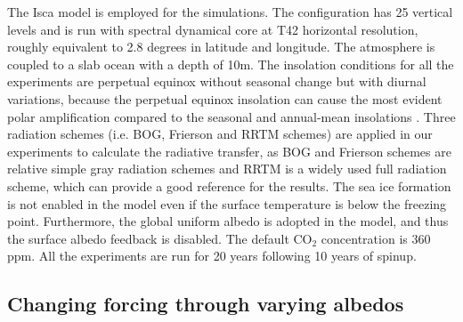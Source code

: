 The Isca model is employed for the simulations. The configuration has 25 vertical levels and is run with spectral dynamical core at T42 horizontal resolution, roughly equivalent to 2.8 degrees in latitude and longitude. The atmosphere is coupled to a slab ocean with a depth of 10m. The insolation conditions for all the experiments are perpetual equinox without seasonal change but with diurnal variations, because the perpetual equinox insolation can cause the most evident polar amplification compared to the seasonal and annual-mean insolations \citep{Kim2018}. Three radiation schemes (i.e. BOG, Frierson and RRTM schemes) are applied in our experiments to calculate the radiative transfer, as BOG and Frierson schemes are relative simple gray radiation schemes and RRTM is a widely used full radiation scheme, which can provide a good reference for the results. The sea ice formation is not enabled in the model even if the surface temperature is below the freezing point. Furthermore, the global uniform albedo is adopted in the model, and thus the surface albedo feedback is disabled. The default CO$_2$ concentration is 360 ppm. All the experiments are run for 20 years following 10 years of spinup.


\subsection{Changing forcing through varying albedos}

